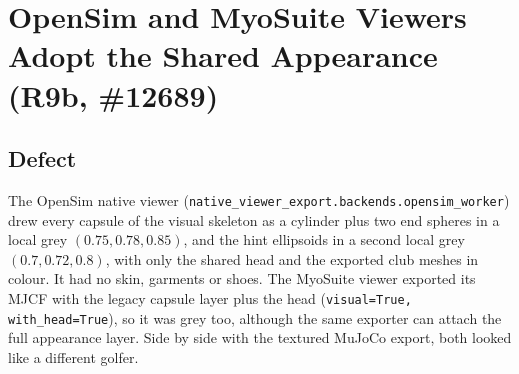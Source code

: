 \section{OpenSim and MyoSuite Viewers Adopt the Shared Appearance (R9b, \#12689)}

\subsection{Defect}
The OpenSim native viewer
(\texttt{native\_viewer\_export.backends.opensim\_worker}) drew every capsule of
the visual skeleton as a cylinder plus two end spheres in a local grey
$(0.75, 0.78, 0.85)$, and the hint ellipsoids in a second local grey
$(0.7, 0.72, 0.8)$, with only the shared head and the exported club meshes in
colour. It had no skin, garments or shoes. The MyoSuite viewer exported its
MJCF with the legacy capsule layer plus the head
(\texttt{visual=True, with\_head=True}), so it was grey too, although the same
exporter can attach the full appearance layer. Side by side with the textured
MuJoCo export, both looked like a different golfer.

